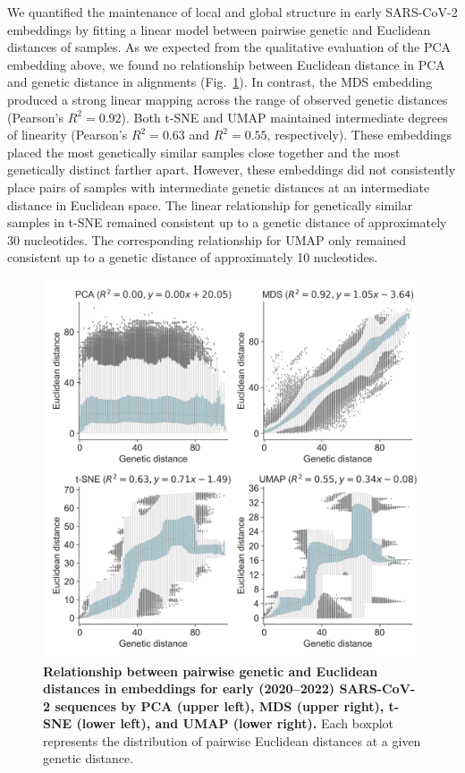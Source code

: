 \documentclass[10pt,letterpaper]{article}
\begin{document}
We quantified the maintenance of local and global structure in early SARS-CoV-2 embeddings by fitting a linear model between pairwise genetic and Euclidean distances of samples.
As we expected from the qualitative evaluation of the PCA embedding above, we found no relationship between Euclidean distance in PCA and genetic distance in alignments (Fig.~\ref{fig:sars-cov-2-pairwise-distances}).
In contrast, the MDS embedding produced a strong linear mapping across the range of observed genetic distances (Pearson's $R^{2}=0.92$).
Both t-SNE and UMAP maintained intermediate degrees of linearity (Pearson's $R^{2}=0.63$ and $R^{2}=0.55$, respectively).
These embeddings placed the most genetically similar samples close together and the most genetically distinct farther apart.
However, these embeddings did not consistently place pairs of samples with intermediate genetic distances at an intermediate distance in Euclidean space.
The linear relationship for genetically similar samples in t-SNE remained consistent up to a genetic distance of approximately 30 nucleotides.
The corresponding relationship for UMAP only remained consistent up to a genetic distance of approximately 10 nucleotides.

\begin{figure}[!h]
\includegraphics[width=\columnwidth]{figures/sarscov2-euclidean-distance-by-genetic-distance.png}
\caption{{\bf Relationship between pairwise genetic and Euclidean distances in embeddings for early (2020--2022) SARS-CoV-2 sequences by PCA (upper left), MDS (upper right), t-SNE (lower left), and UMAP (lower right).}
  Each boxplot represents the distribution of pairwise Euclidean distances at a given genetic distance.
}
\label{fig:sars-cov-2-pairwise-distances}
\end{figure}
\end{document}
